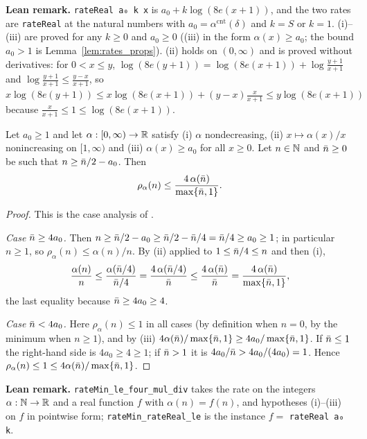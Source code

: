 \textbf{Lean remark.} \texttt{rateReal a₀ k x} is $a_0 + k\log(8e(x+1))$, and the two rates are
\texttt{rateReal} at the natural numbers with $a_0 = \alpha^{\mathrm{cnt}}(\delta)$ and $k = S$ or $k = 1$.
(i)--(iii) are proved for any $k \ge 0$ and $a_0 \ge 0$ ((iii) in the form $\alpha(x) \ge a_0$; the bound
$a_0 > 1$ is Lemma~\ref{lem:rates_props}). (ii) holds on $(0, \infty)$ and is proved without derivatives:
for $0 < x \le y$, $\log(8e(y+1)) = \log(8e(x+1)) + \log\frac{y+1}{x+1}$ and
$\log\frac{y+1}{x+1} \le \frac{y-x}{x+1}$, so $x\log(8e(y+1)) \le x\log(8e(x+1)) + (y-x)\frac{x}{x+1}
\le y\log(8e(x+1))$ because $\frac{x}{x+1} \le 1 \le \log(8e(x+1))$.

\begin{lemma}\label{lem:sc_rate_min_arith}
\leanok
Let $a_0 \ge 1$ and let $\alpha : [0,\infty) \to \mathbb{R}$ satisfy
(i) $\alpha$ nondecreasing, (ii) $x \mapsto \alpha(x)/x$ nonincreasing on $[1,\infty)$ and
(iii) $\alpha(x) \ge a_0$ for all $x \ge 0$. Let $n \in \mathbb{N}$ and $\bar{n} \ge 0$ be such that
$n \ge \bar{n}/2 - a_0$. Then
\[
  \rho_\alpha(n) \le \frac{4\,\alpha(\bar{n})}{\max\{\bar{n}, 1\}} .
\]
\end{lemma}

\begin{proof}
\leanok
{}
This is the case analysis of \cite[Lemma~7]{menard2021fast}.

\emph{Case $\bar{n} \ge 4a_0$.} Then $n \ge \bar{n}/2 - a_0 \ge \bar{n}/2 - \bar{n}/4 = \bar{n}/4 \ge a_0 \ge 1$;
in particular $n \ge 1$, so $\rho_\alpha(n) \le \alpha(n)/n$. By (ii) applied to
$1 \le \bar{n}/4 \le n$ and then (i),
\[
  \frac{\alpha(n)}{n} \le \frac{\alpha(\bar{n}/4)}{\bar{n}/4} = \frac{4\,\alpha(\bar{n}/4)}{\bar{n}} \le \frac{4\,\alpha(\bar{n})}{\bar{n}}
  = \frac{4\,\alpha(\bar{n})}{\max\{\bar{n},1\}},
\]
the last equality because $\bar{n} \ge 4a_0 \ge 4$.

\emph{Case $\bar{n} < 4a_0$.} Here $\rho_\alpha(n) \le 1$ in all cases (by definition when $n = 0$,
by the minimum when $n \ge 1$), and by (iii) $4\alpha(\bar{n})/\max\{\bar{n},1\} \ge 4a_0/\max\{\bar{n},1\}$.
If $\bar{n} \le 1$ the right-hand side is $4a_0 \ge 4 \ge 1$; if $\bar{n} > 1$ it is
$4a_0/\bar{n} > 4a_0/(4a_0) = 1$. Hence $\rho_\alpha(n) \le 1 \le 4\alpha(\bar{n})/\max\{\bar{n},1\}$.
\end{proof}

\textbf{Lean remark.} \texttt{rateMin\_le\_four\_mul\_div} takes the rate on the integers
$\alpha : \mathbb{N} \to \mathbb{R}$ and a real function $f$ with $\alpha(n) = f(n)$, and hypotheses (i)--(iii) on $f$ in
pointwise form; \texttt{rateMin\_rateReal\_le} is the instance $f = $ \texttt{rateReal a₀ k}.

